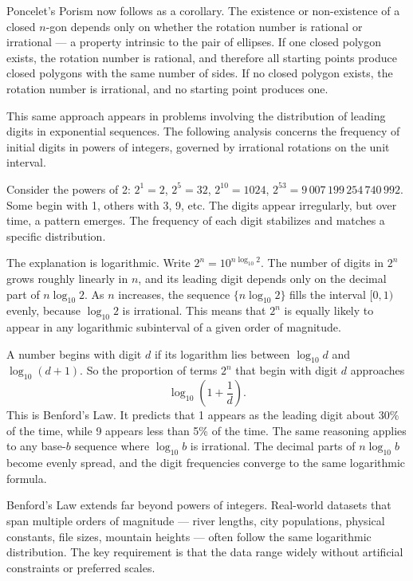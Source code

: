Poncelet's Porism now follows as a corollary. The existence or non-existence of a closed $n$-gon depends only on whether the rotation number is rational or irrational — a property intrinsic to the pair of ellipses. If one closed polygon exists, the rotation number is rational, and therefore all starting points produce closed polygons with the same number of sides. If no closed polygon exists, the rotation number is irrational, and no starting point produces one.

This same approach appears in problems involving the distribution of leading digits in exponential sequences. The following analysis concerns the frequency of initial digits in powers of integers, governed by irrational rotations on the unit interval.

Consider the powers of 2: $2^1 = 2$, $2^5 = 32$, $2^{10} = 1024$, $2^{53} = 9{\,}007{\,}199{\,}254{\,}740{\,}992$. Some begin with 1, others with 3, 9, etc. The digits appear irregularly, but over time, a pattern emerges. The frequency of each digit stabilizes and matches a specific distribution.

The explanation is logarithmic. Write $2^n = 10^{n \log_{10} 2}$. The number of digits in $2^n$ grows roughly linearly in $n$, and its leading digit depends only on the decimal part of $n \log_{10} 2$. As $n$ increases, the sequence $\{ n \log_{10} 2 \}$ fills the interval $[0,1)$ evenly, because $\log_{10} 2$ is irrational. This means that $2^n$ is equally likely to appear in any logarithmic subinterval of a given order of magnitude.

A number begins with digit $d$ if its logarithm lies between $\log_{10} d$ and $\log_{10}(d+1)$. So the proportion of terms $2^n$ that begin with digit $d$ approaches
\[
\log_{10}\left(1 + \frac{1}{d}\right).
\]
This is Benford’s Law. It predicts that 1 appears as the leading digit about 30\% of the time, while 9 appears less than 5\% of the time. The same reasoning applies to any base-$b$ sequence where $\log_{10} b$ is irrational. The decimal parts of $n \log_{10} b$ become evenly spread, and the digit frequencies converge to the same logarithmic formula.

Benford's Law extends far beyond powers of integers. Real-world datasets that span multiple orders of magnitude — river lengths, city populations, physical constants, file sizes, mountain heights — often follow the same logarithmic distribution. The key requirement is that the data range widely without artificial constraints or preferred scales.

